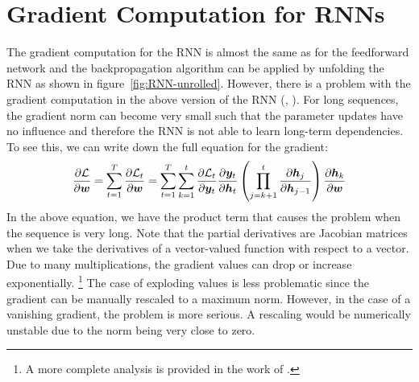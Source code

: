 	\section{Gradient Computation for RNNs}\label{sec:gradient_computation_RNN}
		The gradient computation for the RNN is almost the same as for the feedforward network and the backpropagation algorithm can be applied by unfolding the RNN as shown in figure~\ref{fig:RNN-unrolled}.
		However, there is a problem with the gradient computation in the above version of the RNN (\cite{pascanu2013difficulty}, \cite{bengio1994learning}).
		For long sequences, the gradient norm can become very small such that the parameter updates have no influence and therefore the RNN is not able to learn long-term dependencies.
		To see this, we can write down the full equation for the gradient:
		\begin{equation}\label{eq:gradient_computation_RNN}
			\frac{\partial \mathcal{L}}{\partial \bm{w}}
			= \sum_{t=1}^{T} 
				\frac{\partial \mathcal{L}_t}{\partial \bm{w}}
			= \sum_{t=1}^{T} 
				\sum_{k=1}^{t} 
					\frac{\partial \mathcal{L}_t}{\partial \bm{y}_t}
					\frac{\partial \bm{y}_t}{\partial \bm{h}_t}
					\left(
						\prod_{j=k+1}^{t} \frac{\partial \bm{h}_j}{\partial \bm{h}_{j-1}}
					\right)
					\frac{\partial \bm{h}_{k}}{\partial \bm{w}}
		\end{equation}
		In the above equation, we have the product term that causes the problem when the sequence is very long.
		Note that the partial derivatives are Jacobian matrices when we take the derivatives of a vector-valued function with respect to a vector.
		Due to many multiplications, the gradient values can drop or increase exponentially.%
		\footnote{A more complete analysis is provided in the work of \cite{pascanu2013difficulty}.}
		The case of exploding values is less problematic since the gradient can be manually rescaled to a maximum norm.
		However, in the case of a vanishing gradient, the problem is more serious. 
		A rescaling would be numerically unstable due to the norm being very close to zero. 
		
